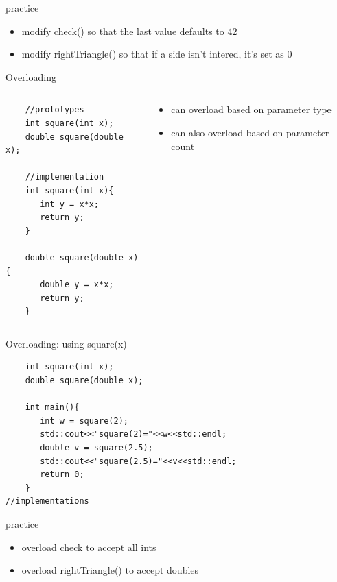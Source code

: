 \documentclass[xcolor={dvipsnames}]{beamer}
\begin{document}
\begin{frame}{practice}
	\begin{itemize}
		\item modify check() so that the last value defaults to 42
		\item modify rightTriangle() so that if a side isn't intered, it's set as 0
	\end{itemize}
\end{frame}

\begin{frame}[fragile]{Overloading}

	\begin{columns}
	\begin{column}{.49\textwidth}
	\begin{verbatim}
	//prototypes
	int square(int x);
	double square(double x);
	
	//implementation
	int square(int x){
	   int y = x*x;
	   return y;
	}
   
	double square(double x){
	   double y = x*x;
	   return y;
	}   
	\end{verbatim}
	\end{column}
	\begin{column}{.49\textwidth}
	\begin{itemize}
		\item can overload based on parameter type
		\item can also overload based on parameter count
	\end{itemize}
	\end{column}
	\end{columns}
\end{frame}


\begin{frame}[fragile]{Overloading: using square(x)}
	\begin{verbatim}
	int square(int x);
	double square(double x);

	int main(){
	   int w = square(2);
	   std::cout<<"square(2)="<<w<<std::endl;
	   double v = square(2.5);
	   std::cout<<"square(2.5)="<<v<<std::endl;
	   return 0;
	}
//implementations
\end{verbatim}
\end{frame}

\begin{frame}{practice}
	\begin{itemize}
		\item overload check to accept all ints
		\item overload rightTriangle() to accept doubles
	\end{itemize}
\end{frame}
\end{document}
